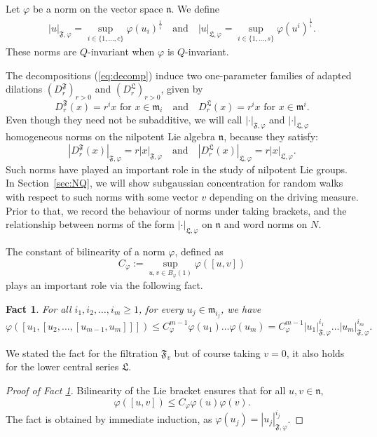 \documentclass[11pt,leqno]{article}
\theoremstyle{plain}
\newtheorem{fact}[theorem]{Fact}
\theoremstyle{definition}
\theoremstyle{remark}
\numberwithin{equation}{section}
\begin{document}
Let $\varphi$ be a norm on the vector space $\mathfrak{n}$. We define
\begin{align}\label{def:norm}
|u|_{\mathfrak{F},\varphi}=\sup_{i\in\{1,\dots,c\}} \varphi(u_i)^{\frac{1}{i}} \quad \textrm{and} \quad |u|_{\mathfrak{L},\varphi}=\sup_{i\in\{1,\dots,s\}} \varphi(u^i)^{\frac{1}{i}}.
\end{align}
These norms are $Q$-invariant when $\varphi$ is $Q$-invariant.


The decompositions (\ref{eq:decomp}) induce two one-parameter families of adapted dilations $\left(D^{\mathfrak{F}}_{r}\right)_{r>0}$ and $\left(D^{\mathfrak{L}}_{r}\right)_{r>0}$, given by 
\[
D^{\mathfrak{F}}_{r}(x)=r^{i}x \textrm{ for } x\in\mathfrak{m}_{i} \quad \textrm{and} \quad D^{\mathfrak{L}}_{r}(x)=r^{i}x \textrm{ for } x\in\mathfrak{m}^{i}.
\]
Even though they need not be subadditive, we will call $|\cdot|_{\mathfrak{F},\varphi}$ and $|\cdot|_{\mathfrak{L},\varphi}$ homogeneous norms on the nilpotent Lie algebra $\mathfrak{n}$, because they satisfy:
\[
\left|D^{\mathfrak{F}}_{r}(x)\right|_{\mathfrak{F},\varphi}=r|x|_{\mathfrak{F},\varphi} \quad \textrm{and} \quad \left|D^{\mathfrak{L}}_{r}(x)\right|_{\mathfrak{L},\varphi}=r|x|_{\mathfrak{L},\varphi}.
\]
Such norms have played an important role in the study of nilpotent Lie groups. In Section~\ref{sec:NQ}, we will show subgaussian concentration for random walks with respect to such norms with some vector $v$ depending on the driving measure. Prior to that, we record the behaviour of norms under taking brackets, and the relationship between norms of the form $|\cdot|_{\mathfrak{L},\varphi}$ on $\mathfrak{n}$ and word norms on $N$.

The constant of bilinearity of a norm $\varphi$, defined as
\[
C_\varphi:=\sup_{u,v\in B_\varphi(1)} \varphi([u,v])
\]
plays an important role via the following fact.

\begin{fact}\label{lem:multicomm} For all $i_{1},i_{2},\ldots,i_{m}\geq1$, for every $u_{j}\in\mathfrak{m}_{i_{j}}$,
we have 
\[
\varphi\left([u_{1},[u_{2},\ldots,[u_{m-1},u_{m}]]]\right)\le C_\varphi^{m-1}\varphi(u_1)\ldots\varphi(u_m)=C_\varphi^{m-1}|u_{1}|_{\mathfrak{F},\varphi}^{i_{1}}\ldots|u_{m}|_{\mathfrak{F},\varphi}^{i_{m}}.
\]
\end{fact}
We stated the fact for the filtration $\mathfrak{F}_v$ but of course taking $v=0$, it also holds for the lower central series $\mathfrak{L}$.
\begin{proof}[Proof of Fact \ref{lem:multicomm}]
Bilinearity of the Lie bracket ensures that for all $u,v\in\mathfrak{n}$,
\[
\varphi([u,v])\le C_\varphi\varphi(u)\varphi(v).
\]
The fact is obtained by immediate induction, as $\varphi(u_j)=|u_j|_{\mathfrak{F},\varphi}^{i_j}$. 
\end{proof}
\end{document}
